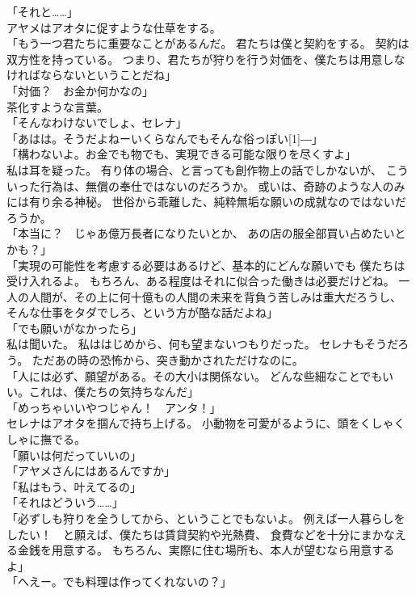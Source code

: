 \documentclass[../IHMain]{subfiles}
\begin{document}
「それと……」\\
アヤメはアオタに促すような仕草をする。\\
「もう一つ君たちに重要なことがあるんだ。
君たちは僕と契約をする。
契約は双方性を持っている。
つまり、君たちが狩りを行う対価を、僕たちは用意しなければならないということだね」\\
「対価？　お金か何かなの」\\
茶化すような言葉。\\
「そんなわけないでしょ、セレナ」\\
「あはは。そうだよねーいくらなんでもそんな俗っぽい\scalebox{3}[1]{―}」\\
「構わないよ。お金でも物でも、実現できる可能な限りを尽くすよ」\\
私は耳を疑った。
有り体の場合、と言っても創作物上の話でしかないが、
こういった行為は、無償の奉仕ではないのだろうか。
或いは、奇跡のような人のみには有り余る神秘。
世俗から乖離した、純粋無垢な願いの成就なのではないだろうか。\\
「本当に？　じゃあ億万長者になりたいとか、
あの店の服全部買い占めたいとかも？」\\
「実現の可能性を考慮する必要はあるけど、基本的にどんな願いでも
僕たちは受け入れるよ。
もちろん、ある程度はそれに似合った働きは必要だけどね。
一人の人間が、その上に何十億もの人間の未来を背負う苦しみは重大だろうし、
そんな仕事をタダでしろ、という方が酷な話だよね」\\
「でも願いがなかったら」\\
私は聞いた。
私ははじめから、何も望まないつもりだった。
セレナもそうだろう。
ただあの時の恐怖から、突き動かされただけなのに。\\
「人には必ず、願望がある。その大小は関係ない。
どんな些細なことでもいい。これは、僕たちの気持ちなんだ」\\
「めっちゃいいやつじゃん！　アンタ！」\\
セレナはアオタを掴んで持ち上げる。
小動物を可愛がるように、頭をくしゃくしゃに撫でる。\\
「願いは何だっていいの」\\
「アヤメさんにはあるんですか」\\
「私はもう、叶えてるの」\\
「それはどういう……」\\
「必ずしも狩りを全うしてから、ということでもないよ。
例えば一人暮らしをしたい！　と願えば、僕たちは賃貸契約や光熱費、
食費などを十分にまかなえる金銭を用意する。
もちろん、実際に住む場所も、本人が望むなら用意するよ」\\
「へえー。でも料理は作ってくれないの？」\\
\end{document}

